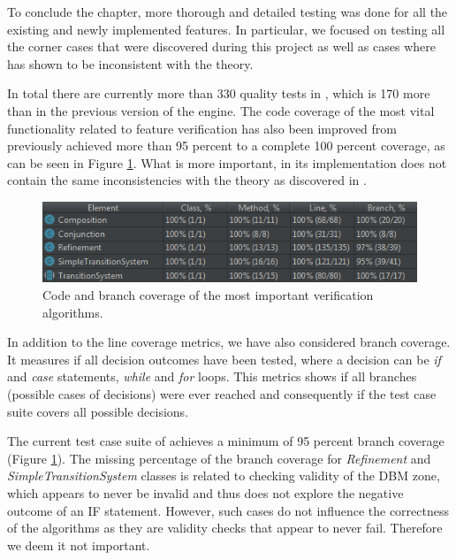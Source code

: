 To conclude the chapter, more thorough and detailed testing was done for all the existing and newly implemented features. In particular, we focused on testing all the corner cases that were discovered during this project as well as cases where  has shown to be inconsistent with the theory.

In total there are currently more than 330 quality tests in \jecdar, which is 170 more than in the previous version of the engine. The code coverage of the most vital functionality related to feature verification has also been improved from previously achieved more than 95 percent to a complete 100 percent coverage, as can be seen in Figure \ref{fig:code-coverage}. What is more important, in its implementation \jecdar does not contain the same inconsistencies with the theory as discovered in .

\begin{figure}
    \centering
    \includegraphics[scale = 0.7]{figures/code-coverage.png}
    \caption{Code and branch coverage of the most important verification algorithms.}
    \label{fig:code-coverage}
\end{figure}

In addition to the line coverage metrics, we have also considered branch coverage. It measures if all decision outcomes have been tested, where a decision can be \textit{if} and \textit{case} statements, \textit{while} and \textit{for} loops. This metrics shows if all branches (possible cases of decisions) were ever reached and consequently if the test case suite covers all possible decisions. 

The current test case suite of \jecdar achieves a minimum of 95 percent branch coverage (Figure \ref{fig:code-coverage}). The missing percentage of the branch coverage for \textit{Refinement} and \textit{SimpleTransitionSystem} classes is related to checking validity of the DBM zone, which appears to never be invalid and thus does not explore the negative outcome of an IF statement. However, such cases do not influence the correctness of the algorithms as they are validity checks that appear to never fail. Therefore we deem it not important.